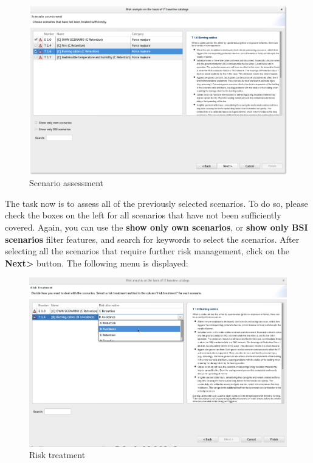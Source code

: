 \documentclass[a4paper,10pt]{book}
\begin{document}
\begin{figure}[htb!]
  \centering
  \includegraphics[width=\textwidth]{Screenshot/Gefaehrdungsbewertung-en.png}
  \caption{\label{Scenario assessment} Scenario assessment}
\end{figure}
\newline
The task now is to assess all of the previously selected scenarios. To do so, please check the boxes
on the left for all scenarios that have not been sufficiently covered. Again, you can use the
\textbf{show only own scenarios}, or \textbf{show only BSI scenarios} filter features, and
search for keywords to select the scenarios. After selecting all the scenarios that require
further risk management, click on the \textbf{Next\textgreater} button. The following menu is displayed:
\newline
\begin{figure}[htb!]
  \centering
  \includegraphics[width=\textwidth]{Screenshot/Risikobehandlung-en.png}
  \caption{\label{Risk treatment} Risk treatment}
\end{figure}
\end{document}
